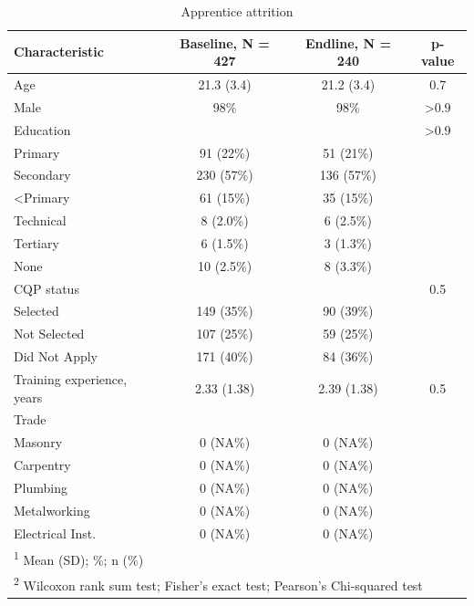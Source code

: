 \documentclass[
  11pt,
a4paper
]{report}
\begin{document}
\begin{table}[H]

\caption{\label{tab:tbl-attritionapps}Apprentice attrition}
\centering
\begin{tabular}[t]{lccc}
\toprule
\textbf{Characteristic} & \textbf{Baseline}, N = 427 & \textbf{Endline}, N = 240 & \textbf{p-value}\\
\midrule
Age & 21.3 (3.4) & 21.2 (3.4) & 0.7\\
Male & 98\% & 98\% & >0.9\\
Education &  &  & >0.9\\
\hspace{1em}Primary & 91 (22\%) & 51 (21\%) & \\
\hspace{1em}Secondary & 230 (57\%) & 136 (57\%) & \\
\hspace{1em}<Primary & 61 (15\%) & 35 (15\%) & \\
\hspace{1em}Technical & 8 (2.0\%) & 6 (2.5\%) & \\
\hspace{1em}Tertiary & 6 (1.5\%) & 3 (1.3\%) & \\
\hspace{1em}None & 10 (2.5\%) & 8 (3.3\%) & \\
CQP status &  &  & 0.5\\
\hspace{1em}Selected & 149 (35\%) & 90 (39\%) & \\
\hspace{1em}Not Selected & 107 (25\%) & 59 (25\%) & \\
\hspace{1em}Did Not Apply & 171 (40\%) & 84 (36\%) & \\
Training experience, years & 2.33 (1.38) & 2.39 (1.38) & 0.5\\
Trade &  &  & \\
\hspace{1em}Masonry & 0 (NA\%) & 0 (NA\%) & \\
\hspace{1em}Carpentry & 0 (NA\%) & 0 (NA\%) & \\
\hspace{1em}Plumbing & 0 (NA\%) & 0 (NA\%) & \\
\hspace{1em}Metalworking & 0 (NA\%) & 0 (NA\%) & \\
\hspace{1em}Electrical Inst. & 0 (NA\%) & 0 (NA\%) & \\
\bottomrule
\multicolumn{4}{l}{\rule{0pt}{1em}\textsuperscript{1} Mean (SD); \%; n (\%)}\\
\multicolumn{4}{l}{\rule{0pt}{1em}\textsuperscript{2} Wilcoxon rank sum test; Fisher's exact test; Pearson's Chi-squared test}\\
\end{tabular}
\end{table}
\end{document}
